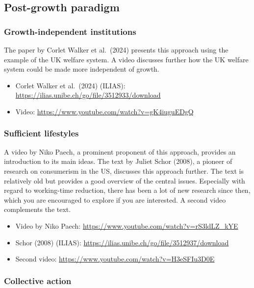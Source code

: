 \documentclass[
  british,
  a4paper,
  DIV=11,
  numbers=noendperiod,
  oneside,
  openany]{scrreprt}
\providecommand{\tightlist}{%
  \setlength{\itemsep}{0pt}\setlength{\parskip}{0pt}}
\begin{document}
\subsection{Post-growth paradigm}\label{post-growth-paradigm-1}

\subsubsection{Growth-independent
institutions}\label{growth-independent-institutions-1}

The paper by Corlet Walker et al.~(2024) presents this approach using
the example of the UK welfare system. A video discusses further how the
UK welfare system could be made more independent of growth.

\begin{itemize}
\tightlist
\item
  Corlet Walker et al.~(2024) (ILIAS):
  \url{https://ilias.unibe.ch/go/file/3512933/download}
\item
  Video: \url{https://www.youtube.com/watch?v=gK4iuguEDgQ}
\end{itemize}

\subsubsection{Sufficient lifestyles}\label{sufficient-lifestyles-1}

A video by Niko Paech, a prominent proponent of this approach, provides
an introduction to its main ideas. The text by Juliet Schor (2008), a
pioneer of research on consumerism in the US, discusses this approach
further. The text is relatively old but provides a good overview of the
central issues. Especially with regard to working-time reduction, there
has been a lot of new research since then, which you are encouraged to
explore if you are interested. A second video complements the text.

\begin{itemize}
\tightlist
\item
  Video by Niko Paech: \url{https://www.youtube.com/watch?v=rS3ldLZ_kYE}
\item
  Schor (2008) (ILIAS):
  \url{https://ilias.unibe.ch/go/file/3512937/download}
\item
  Second video: \url{https://www.youtube.com/watch?v=H3eSFIu3D0E}
\end{itemize}

\subsubsection{Collective action}\label{collective-action-1}
\end{document}
